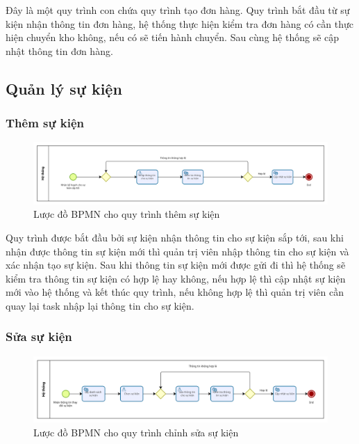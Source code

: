 Đây là một quy trình con chứa quy trình tạo đơn hàng. Quy trình bắt đầu từ sự kiện nhận thông tin đơn hàng, hệ thống thực hiện kiểm tra đơn hàng có cần thực hiện chuyển kho không, nếu có sẽ tiến hành chuyển. Sau cùng hệ thống sẽ cập nhật thông tin đơn hàng.


\subsection{Quản lý sự kiện}

\subsubsection{Thêm sự kiện}

\begin{figure}[!htp]
	\centering
	\includegraphics[width=14cm]{img/BPMN/event/add_event.png}
	\newline
	\caption{Lược đồ BPMN cho quy trình thêm sự kiện}
\end{figure}

Quy trình được bắt đầu bởi sự kiện nhận thông tin cho sự kiện sắp tới, sau khi nhận được thông tin sự kiện mới thì quản trị viên nhập thông tin cho sự kiện và xác nhận tạo sự kiện. Sau khi thông tin sự kiện mới được gửi đi thì hệ thống sẽ kiểm tra thông tin sự kiện có hợp lệ hay không, nếu hợp lệ thì cập nhật sự kiện mới vào hệ thống và kết thúc quy trình, nếu không hợp lệ thì quản trị viên cần quay lại task nhập lại thông tin cho sự kiện.

\subsubsection{Sửa sự kiện}

\begin{figure}[!htp]
	\centering
	\includegraphics[width=14cm]{img/BPMN/event/edit_event.png}
	\newline
	\caption{Lược đồ BPMN cho quy trình chỉnh sửa sự kiện}
\end{figure}

